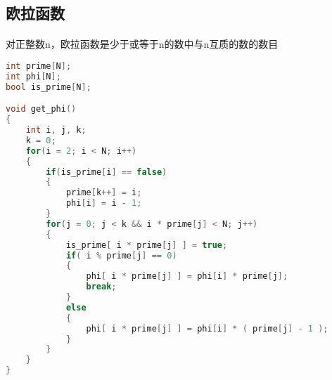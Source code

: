 ﻿\subsection{欧拉函数}
\paragraph{}
对正整数n，欧拉函数是少于或等于n的数中与n互质的数的数目
    \begin{lstlisting}[language=C++]
int prime[N];
int phi[N];
bool is_prime[N];

void get_phi()
{
    int i, j, k;
    k = 0;
    for(i = 2; i < N; i++)
    {
        if(is_prime[i] == false)
        {
            prime[k++] = i;
            phi[i] = i - 1;
        }
        for(j = 0; j < k && i * prime[j] < N; j++)
        {
            is_prime[ i * prime[j] ] = true;
            if( i % prime[j] == 0)
            {
                phi[ i * prime[j] ] = phi[i] * prime[j];
                break;
            }
            else
            {
                phi[ i * prime[j] ] = phi[i] * ( prime[j] - 1 );
            }
        }
    }
}
\end{lstlisting}
